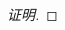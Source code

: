 \documentclass[a4paper, 12pt]{article} %
\begin{document}
\begin{CJK}{UTF8}{gkai}
\begin{proof}[证明]
\begin{comment}
将 \eqref{eq:2} 两边同时乘以 $u$,可得
\begin{equation}
  \label{eq:3}
  \frac{\pa u_1}{\pa y}Pu+u_1u \frac{\pa P}{\pa y}=\frac{\pa u_1}{\pa
    x}Qu+uu_1 \frac{\pa Q}{\pa x}.
\end{equation}
\eqref{eq:3} 和 \eqref{eq:1} 结合可得
\begin{equation}
  \label{eq:4}
  \frac{\pa u_1}{\pa y}Pu+u_1(\frac{\pa u}{\pa x}Q+u \frac{\pa Q}{\pa
    x}-\frac{\pa u}{\pa y}P)=\frac{\pa u_1}{\pa
    x}Qu+uu_1 \frac{\pa Q}{\pa x}.
\end{equation}





我们现在来证明

\begin{equation}
  \label{eq:3}
  \frac{\pa u_1}{\pa x}=\frac{\pa u}{\pa x}g(\Phi)+\frac{\pa u}{\pa x}\frac{\pa g}{\pa
    \Phi}uP.
\end{equation}

\end{comment}

  \end{proof}
  
  
  
  
  
\end{CJK}
\end{document}
